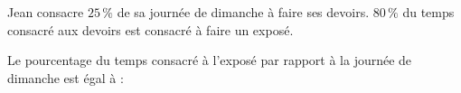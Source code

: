 
Jean consacre $25\,\%$ de sa journée de dimanche à faire ses devoirs. $80\,\%$ du temps consacré aux devoirs est consacré à faire un exposé.

Le pourcentage du temps consacré à l'exposé par rapport à la journée de dimanche est égal à :

\smallskip

